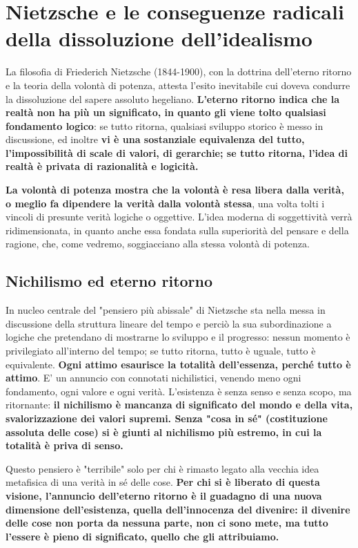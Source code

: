 \chapter{Nietzsche e le conseguenze radicali della dissoluzione dell'idealismo}
\bigskip
\bigskip
\bigskip
\bigskip
\bigskip
\bigskip


La filosofia di Friederich Nietzsche (1844-1900), con la dottrina dell'eterno ritorno e la teoria della volontà di potenza, attesta l'esito inevitabile cui doveva condurre la dissoluzione del sapere assoluto hegeliano. \textbf{L'eterno ritorno indica che la realtà non ha più un significato, in quanto gli viene tolto qualsiasi fondamento logico}: se tutto ritorna, qualsiasi sviluppo storico è messo in discussione, ed inoltre \textbf{vi è una sostanziale equivalenza del tutto, l'impossibilità di scale di valori, di gerarchie; se tutto ritorna,  l'idea di realtà è privata di razionalità e logicità.}

\textbf{La volontà di potenza mostra che la volontà è resa libera dalla verità, o meglio fa dipendere la verità dalla volontà stessa}, una volta tolti i vincoli di presunte verità logiche o oggettive. L'idea moderna di soggettività verrà ridimensionata, in quanto anche essa fondata sulla superiorità del pensare e della ragione, che, come vedremo, soggiacciano alla stessa volontà di potenza.

\section{Nichilismo ed eterno ritorno}

In nucleo centrale del "pensiero più abissale" di Nietzsche sta nella messa in discussione della struttura lineare del tempo e perciò la sua subordinazione a logiche che pretendano di mostrarne lo sviluppo e il progresso: nessun momento è privilegiato all'interno del tempo; se tutto ritorna, tutto è uguale, tutto è equivalente. \textbf{Ogni attimo esaurisce la totalità dell'essenza, perché tutto è attimo}.
E' un annuncio con connotati nichilistici, venendo meno ogni fondamento, ogni valore e ogni verità. L'esistenza è senza senso e senza scopo, ma ritornante: \textbf{il nichilismo è  mancanza di significato del mondo e della vita, svalorizzazione dei valori supremi. Senza "cosa in sé" (costituzione assoluta delle cose) si è giunti al nichilismo più estremo, in cui la totalità è priva di senso.}

Questo pensiero è "terribile" solo per chi è rimasto legato alla vecchia idea metafisica di una verità in sé delle cose. \textbf{Per chi si è liberato di questa visione, l'annuncio dell'eterno ritorno è il guadagno di una nuova dimensione dell'esistenza, quella dell'innocenza del divenire: il divenire delle cose non porta da nessuna parte, non ci sono mete, ma tutto l'essere è pieno di significato, quello che gli attribuiamo.}

